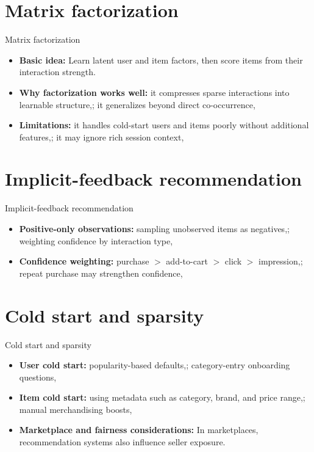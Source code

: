 \documentclass[aspectratio=169]{beamer}
\begin{document}
\section{Matrix factorization}

\begin{frame}{Matrix factorization}
  \begin{itemize}
    \item \textbf{Basic idea:} Learn latent user and item factors, then score items from their interaction strength.
    \item \textbf{Why factorization works well:} it compresses sparse interactions into learnable structure,; it generalizes beyond direct co-occurrence,
    \item \textbf{Limitations:} it handles cold-start users and items poorly without additional features,; it may ignore rich session context,
  \end{itemize}
\end{frame}

\section{Implicit-feedback recommendation}

\begin{frame}{Implicit-feedback recommendation}
  \begin{itemize}
    \item \textbf{Positive-only observations:} sampling unobserved items as negatives,; weighting confidence by interaction type,
    \item \textbf{Confidence weighting:} purchase $>$ add-to-cart $>$ click $>$ impression,; repeat purchase may strengthen confidence,
  \end{itemize}
\end{frame}

\section{Cold start and sparsity}

\begin{frame}{Cold start and sparsity}
  \begin{itemize}
    \item \textbf{User cold start:} popularity-based defaults,; category-entry onboarding questions,
    \item \textbf{Item cold start:} using metadata such as category, brand, and price range,; manual merchandising boosts,
    \item \textbf{Marketplace and fairness considerations:} In marketplaces, recommendation systems also influence seller exposure.
  \end{itemize}
\end{frame}
\end{document}
